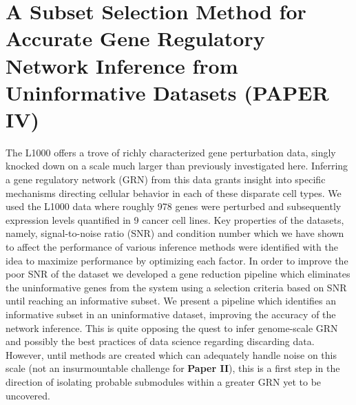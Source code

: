 

\section{A Subset Selection Method for Accurate Gene Regulatory Network Inference from Uninformative Datasets (PAPER IV)}

The L1000 \citep{subramanian2017next} offers a trove of richly characterized gene perturbation data, singly knocked down on a scale much larger than previously investigated here. Inferring a gene regulatory network (GRN) from this data grants insight into specific mechanisms directing cellular behavior in each of these disparate cell types. We used the L1000 data where roughly 978 genes were perturbed and subsequently expression levels quantified in 9 cancer cell lines. Key properties of the datasets, namely, signal-to-noise ratio (SNR) and condition number which we have shown to affect the performance of various inference methods were identified with the idea to maximize performance by optimizing each factor. 
In order to improve the poor SNR of the dataset we developed a gene reduction pipeline which eliminates the uninformative genes from the system using a selection criteria based on SNR until reaching an informative subset. We present a pipeline which identifies an informative subset in an uninformative dataset, improving the accuracy of the network inference.
This is quite opposing the quest to infer genome-scale GRN and possibly the best practices of data science regarding discarding data. However, until methods are created which can adequately handle noise on this scale (not an insurmountable challenge for \textbf{Paper II}), this is a first step in the direction of isolating probable submodules within a greater GRN yet to be uncovered.
